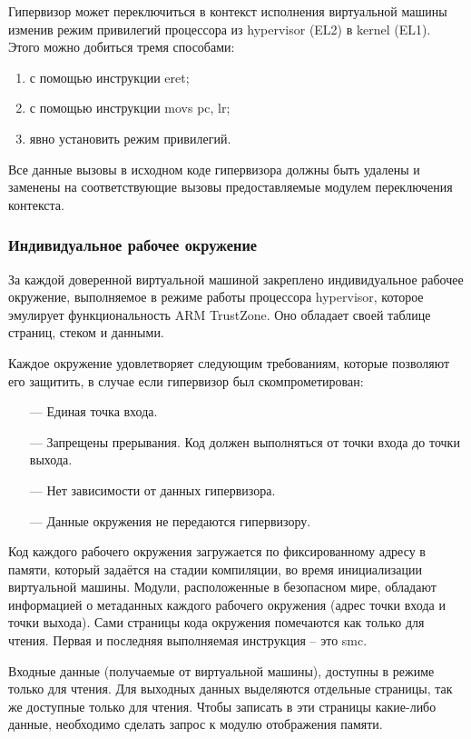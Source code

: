 Гипервизор может переключиться в контекст исполнения виртуальной машины изменив режим привилегий процессора из hypervisor (EL2) в kernel (EL1). Этого можно добиться тремя способами:

\begin{enumerate}
	\item с помощью инструкции eret;
	\item с помощью инструкции movs pc, lr;
	\item явно установить режим привилегий.
\end{enumerate}

Все данные вызовы в исходном коде гипервизора должны быть удалены и заменены на соответствующие вызовы предоставляемые модулем переключения контекста.

\subsubsection{Индивидуальное рабочее окружение}

За каждой доверенной виртуальной машиной закреплено индивидуальное рабочее окружение, выполняемое в режиме работы процессора hypervisor, которое эмулирует функциональность ARM TrustZone. Оно обладает своей таблице страниц, стеком и данными.

Каждое окружение удовлетворяет следующим требованиям, которые позволяют его защитить, в случае если гипервизор был скомпрометирован:

\begin{itemize}
	\item [---] Единая точка входа.
	\item [---] Запрещены прерывания. Код должен выполняться от точки входа до точки выхода.
	\item [---] Нет зависимости от данных гипервизора.
	\item [---] Данные окружения не передаются гипервизору.
\end{itemize}

Код каждого рабочего окружения загружается по фиксированному адресу в памяти, который задаётся на стадии компиляции, во время инициализации виртуальной машины. Модули, расположенные в безопасном мире, обладают информацией о метаданных каждого рабочего окружения (адрес точки входа и точки выхода). Сами страницы кода окружения помечаются как только для чтения. Первая и последняя выполняемая инструкция -- это smc. 

Входные данные (получаемые от виртуальной машины), доступны в режиме только для чтения. Для выходных данных выделяются отдельные страницы, так же доступные только для чтения. Чтобы записать в эти страницы какие-либо данные, необходимо сделать запрос к модулю отображения памяти. 

